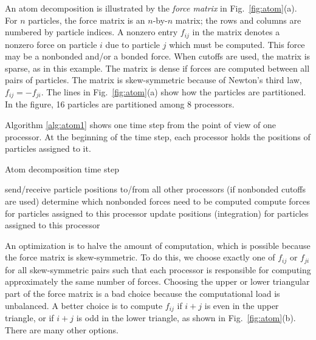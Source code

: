 An atom decomposition is illustrated by the {\em force matrix} in
Fig.~\ref{fig:atom}(a).  For $n$ particles, the force matrix is an $n$-by-$n$
matrix; the rows and columns are numbered by particle indices.  A nonzero
entry $f_{ij}$ in the matrix denotes a nonzero force on particle $i$
due to particle $j$ which must be computed.  This force may be a nonbonded
and/or a bonded force.  When cutoffs are used, the matrix is sparse, as
in this example.  The matrix is dense if forces are computed between all
pairs of particles.  The matrix is skew-symmetric because of Newton's 
third law, $f_{ij} = -f_{ji}$.
The lines in Fig.~\ref{fig:atom}(a) show how the particles are
partitioned.  In the figure, 16 particles are partitioned among
8 processors.

Algorithm \ref{alg:atom1} shows one time step from the point of view of
one processor.  At the beginning of the time step,
each processor holds the positions of particles assigned to it.
\begin{algorithm}
\caption{Atom decomposition time step}
\label{alg:atom1}
\begin{algorithmic}[1]
\STATE send/receive particle positions to/from all other processors
\STATE (if nonbonded cutoffs are used) determine which nonbonded forces need to be computed
\STATE compute forces for particles assigned to this processor
\STATE update positions (integration) for particles assigned to this processor
\end{algorithmic}
\end{algorithm}

An optimization is to halve the amount of computation, which is possible because the
force matrix is skew-symmetric.  To do this, we choose
exactly one of $f_{ij}$ or $f_{ji}$ for all skew-symmetric pairs such that each
processor is responsible for computing approximately the same number of
forces.  Choosing the upper or lower triangular part of the force matrix
is a bad choice because the computational load is unbalanced.  A better
choice is to compute $f_{ij}$ if $i+j$ is even in the upper triangle, or
if $i+j$ is odd in the lower triangle, as shown in Fig.~\ref{fig:atom}(b).
There are many other options.

